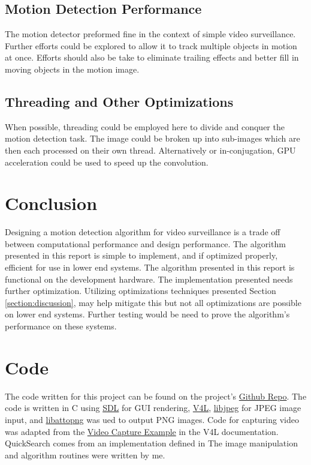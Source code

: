 \documentclass[journal]{IEEEtran}
\begin{document}
\subsection{Motion Detection Performance}
The motion detector preformed fine in the context of simple video surveillance. Further efforts could be
explored to allow it to track multiple objects in motion at once. Efforts should also be take to eliminate
trailing effects and better fill in moving objects in the motion image.

\subsection{Threading and Other Optimizations}
When possible, threading could be employed here to divide and conquer the motion detection task. The image
could be broken up into sub-images which are then each processed on their own thread. Alternatively or
in-conjugation, GPU acceleration could be used to speed up the convolution.

\section{Conclusion}
Designing a motion detection algorithm for video surveillance is a trade off between computational performance 
and design performance. The algorithm presented in this report is simple to implement, and if optimized
properly, efficient for use in lower end systems. The algorithm presented in this report is functional on
the development hardware. The implementation presented needs further optimization. Utilizing optimizations 
techniques presented Section \ref{section:discussion}, may help mitigate this but not all optimizations are 
possible on lower end systems. Further testing would be need to prove the algorithm's performance
on these systems.

\appendices
\section{Code}
\label{appendix:code}
The code written for this project can be found on the project's  
\href{https://github.com/joeyahines/motion_detector}{Github Repo}. The code is written in C using \href{https://www.libsdl.org/}{SDL} for GUI rendering,  \href{https://www.linuxtv.org/downloads/v4l-dvb-apis-new/uapi/v4l/v4l2.html}{V4L}, \href{http://libjpeg.sourceforge.net/}{libjpeg} for JPEG image input, and \href{https://github.com/misc0110/libattopng}{libattopng} was ued to output PNG images. Code for capturing video was adapted from the \href{https://www.linuxtv.org/downloads/v4l-dvb-apis-new/uapi/v4l/capture.c.html}{Video Capture Example} in the V4L documentation. QuickSearch comes from an implementation defined in \cite{num_in_c}
The image manipulation and algorithm routines were written by me. 
\end{document}
